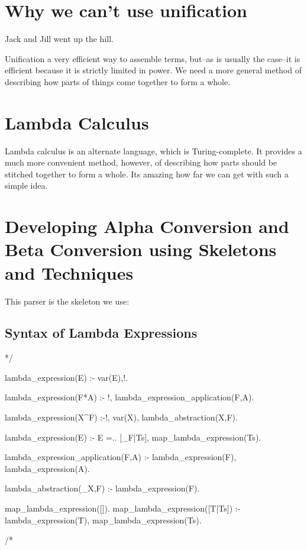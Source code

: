 \documentclass{book}[9pt]
\newenvironment{code}%
{\small \verbatim}%
{\endverbatim \large}
\begin{document}
\label{language_game_and}

\section{Why we can't use unification}

Jack and Jill went up the hill. 

Unification a very efficient way to assemble terms, but--as is usually
the case--it is efficient because it is strictly limited in power.  We
need a more general method of describing how parts of things come
together to form a whole.

\section{Lambda Calculus}

Lambda calculus is an alternate language, which is Turing-complete. It
provides a much more convenient method, however, of describing how
parts should be stitched together to form a whole. Its amazing how far
we can get with such a simple idea.


\section{Developing Alpha Conversion and Beta Conversion using Skeletons and Techniques}

This parser is the skeleton we use:

\subsection{Syntax of Lambda Expressions}

\begin{code}
*/

lambda_expression(E) :- var(E),!.

lambda_expression(F*A) :- !,
        lambda_expression_application(F,A).

lambda_expression(X^F) :-!,
        var(X),
        lambda_abstraction(X,F).

lambda_expression(E) :-
        E =.. [_F|Ts],
        map_lambda_expression(Ts).

lambda_expression_application(F,A) :-
        lambda_expression(F),
        lambda_expression(A).

lambda_abstraction(_X,F) :-
        lambda_expression(F).

map_lambda_expression([]).
map_lambda_expression([T|Ts]) :-
        lambda_expression(T),
        map_lambda_expression(Ts).

/*
\end{code}
\end{document}

